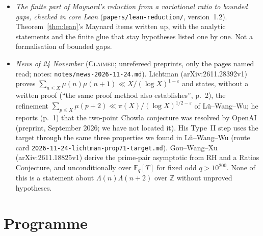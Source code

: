 \documentclass[11pt]{amsart}
\theoremstyle{definition}
\theoremstyle{remark}
\newcommand{\lbl}[1]{\textup{\textsc{#1}}}
\begin{document}
\begin{sloppypar}
\begin{itemize}
on the divisor bound (4.9) (a consequence of Shiu's theorem, which we have not read) and on Mertens; Section~4.8,
(4.148)--(4.157), conditional on Proposition~4.5(ii) (checked only relative to the machinery of Proposition~4.5(i), whose
inputs it inherits) and on Mertens. All cards were audited by a fresh-context helper.
Judged from the card list, every part of their Section~4 from (4.9) to (4.157) has now been the subject of a card,
(4.9) itself only as a named input. A card of 28 November covers pp.~15--16, (4.1)--(4.8) (proved relative to their
definitions, given Mertens; audited). No error has been found; the divisor bound (4.9) is next, then Section~5. This is evidence about their proof, not a verification of it.
\item \emph{The finite part of Maynard's reduction from a variational ratio to bounded gaps, checked in core Lean}
(\texttt{papers/}\allowbreak\texttt{lean-reduction/}, version~1.2). Theorem~\ref{thm:lean}'s Maynard items written up, with
the analytic statements and the finite glue that stay hypotheses listed one by one. Not a formalisation of bounded gaps.
\item \emph{News of 24 November} (\lbl{Claimed}; unrefereed preprints, only the pages named read; notes:
\texttt{notes/}\allowbreak\texttt{news-2026-11-24.md}). Lichtman (arXiv:2611.28392v1) proves
$\sum_{n\le X}\mu(n)\mu(n+1)\ll X/(\log X)^{1-\varepsilon}$ and states, without a written proof (``the same proof
method also establishes'', p.~2), the refinement $\sum_{p\le X}\mu(p+2)\ll\pi(X)/(\log X)^{1/2-\varepsilon}$ of
L\"u--Wang--Wu; he reports (p.~1) that the two-point Chowla conjecture was resolved by OpenAI (preprint, September
2026; we have not located it). His Type~II step uses the target through the same three properties we found in
L\"u--Wang--Wu (route card \texttt{2026-11-24-lichtman-prop71-target.md}). Gou--Wang--Xu (arXiv:2611.18825v1) derive the
prime-pair asymptotic from RH and a Ratios Conjecture, and unconditionally over $\mathbb F_q[T]$ for fixed odd
$q>10^{200}$. None of this is a statement about $\Lambda(n)\Lambda(n+2)$ over $\mathbb Z$ without unproved hypotheses.
\end{itemize}
\end{sloppypar}

\section{Programme}\label{sec:prog}
\end{document}
